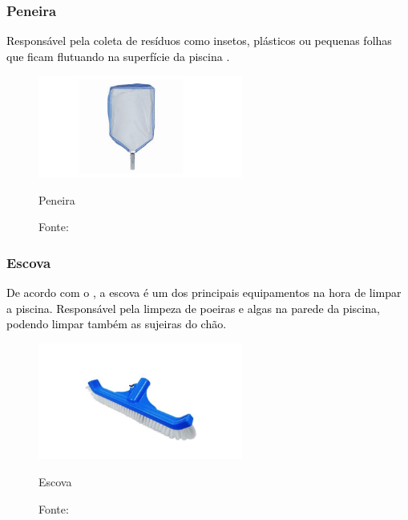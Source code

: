         \subsubsection*{Peneira}

         \textcolor{black}{Responsável pela coleta de resíduos como insetos, plásticos ou pequenas folhas que ficam flutuando na superfície da piscina \cite{benedito2024projeto}.}

            \begin{figure}[H]
                \centering
                \caption{ }  
                \centering
                \label{fig:cont}
                \includegraphics[width=0.60\textwidth]{imagens/peneira.png}
                \caption*{Peneira}
                \caption*{Fonte: \cite{benedito2024projeto}}
            \end{figure}

        \subsubsection*{Escova}

         \textcolor{black}{De acordo com o \cite{benedito2024projeto}, a escova é um dos principais equipamentos na hora de limpar a piscina. Responsável pela limpeza de poeiras e algas na parede da piscina, podendo limpar também as sujeiras do chão.}

            \begin{figure}[H]
                \centering
                \caption{ }  
                \centering
                \label{fig:cont}
                \includegraphics[width=0.60\textwidth]{imagens/escova.png}
                \caption*{Escova}
                \caption*{Fonte: \cite{benedito2024projeto}}
            \end{figure}

